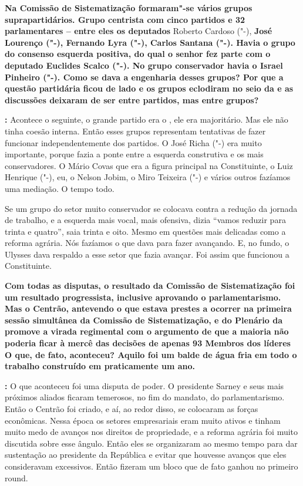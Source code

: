\textbf{Na Comissão de Sistematização formaram"-se vários grupos
suprapartidários. Grupo centrista com cinco partidos e 32 parlamentares
-- entre eles os deputados} Roberto Cardoso ("-), \textbf{José
Lourenço ("-), Fernando Lyra ("-), Carlos Santana ("-).
Havia o grupo do consenso esquerda positiva, do qual o senhor fez parte
com o deputado Euclides Scalco ("-). No grupo conservador havia o
Israel Pinheiro ("-). Como se dava a engenharia desses grupos? Por
que a questão partidária ficou de lado e os grupos eclodiram no seio da
 e as discussões deixaram de ser entre partidos, mas entre grupos? }

\textbf{:} Acontece o seguinte, o grande partido era o , ele era
majoritário. Mas ele não tinha coesão interna. Então esses grupos
representam tentativas de fazer funcionar independentemente dos
partidos. O José Richa ("-) era muito importante, porque fazia a
ponte entre a esquerda construtiva e os mais conservadores. O Mário
Covas que era a figura principal na Constituinte, o Luiz Henrique
("-), eu, o Nelson Jobim, o Miro Teixeira ("-) e vários outros
fazíamos uma mediação. O tempo todo.

Se um grupo do setor muito conservador se colocava contra a redução da
jornada de trabalho, e a esquerda mais vocal, mais ofensiva, dizia
``vamos reduzir para trinta e quatro'', saia trinta e oito. Mesmo em
questões mais delicadas como a reforma agrária. Nós fazíamos o que dava
para fazer avançando. E, no fundo, o Ulysses dava respaldo a esse setor
que fazia avançar. Foi assim que funcionou a Constituinte.

\textbf{Com todas as disputas, o resultado da Comissão de Sistematização
foi um resultado progressista, inclusive aprovando o parlamentarismo.
Mas o Centrão, antevendo o que estava prestes a ocorrer na primeira
sessão simultânea da Comissão de Sistematização, e do Plenário da 
promove a virada regimental com o argumento de que a maioria não poderia
ficar à mercê das decisões de apenas 93 Membros dos líderes O que, de
fato, aconteceu? Aquilo foi um balde de água fria em todo o trabalho
construído em praticamente um ano.}

\textbf{:} O que aconteceu foi uma disputa de poder. O presidente
Sarney e seus mais próximos aliados ficaram temerosos, no fim do
mandato, do parlamentarismo. Então o Centrão foi criado, e aí, ao redor
disso, se colocaram as forças econômicas. Nessa época os setores
empresariais eram muito ativos e tinham muito medo de avanços nos
direitos de propriedade, e a reforma agrária foi muito discutida sobre
esse ângulo. Então eles se organizaram ao mesmo tempo para dar
sustentação ao presidente da República e evitar que houvesse avanços que
eles consideravam excessivos. Então fizeram um bloco que de fato ganhou
no primeiro round.

